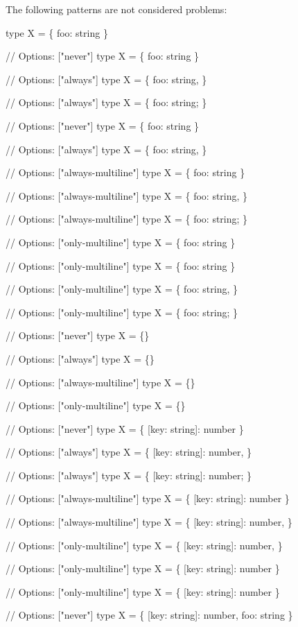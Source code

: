 The following patterns are not considered problems\+:


\begin{DoxyCode}
type X = \{ foo: string \}

// Options: ["never"]
type X = \{ foo: string \}

// Options: ["always"]
type X = \{ foo: string, \}

// Options: ["always"]
type X = \{ foo: string; \}

// Options: ["never"]
type X = \{
foo: string
\}

// Options: ["always"]
type X = \{
foo: string,
\}

// Options: ["always-multiline"]
type X = \{ foo: string \}

// Options: ["always-multiline"]
type X = \{
foo: string,
\}

// Options: ["always-multiline"]
type X = \{
foo: string;
\}

// Options: ["only-multiline"]
type X = \{ foo: string \}

// Options: ["only-multiline"]
type X = \{
foo: string
\}

// Options: ["only-multiline"]
type X = \{
foo: string,
\}

// Options: ["only-multiline"]
type X = \{
foo: string;
\}

// Options: ["never"]
type X = \{\}

// Options: ["always"]
type X = \{\}

// Options: ["always-multiline"]
type X = \{\}

// Options: ["only-multiline"]
type X = \{\}

// Options: ["never"]
type X = \{ [key: string]: number \}

// Options: ["always"]
type X = \{ [key: string]: number, \}

// Options: ["always"]
type X = \{ [key: string]: number; \}

// Options: ["always-multiline"]
type X = \{ [key: string]: number \}

// Options: ["always-multiline"]
type X = \{
[key: string]: number,
\}

// Options: ["only-multiline"]
type X = \{
[key: string]: number,
\}

// Options: ["only-multiline"]
type X = \{
[key: string]: number
\}

// Options: ["only-multiline"]
type X = \{ [key: string]: number \}

// Options: ["never"]
type X = \{ [key: string]: number, foo: string \}


\end{DoxyCode}
